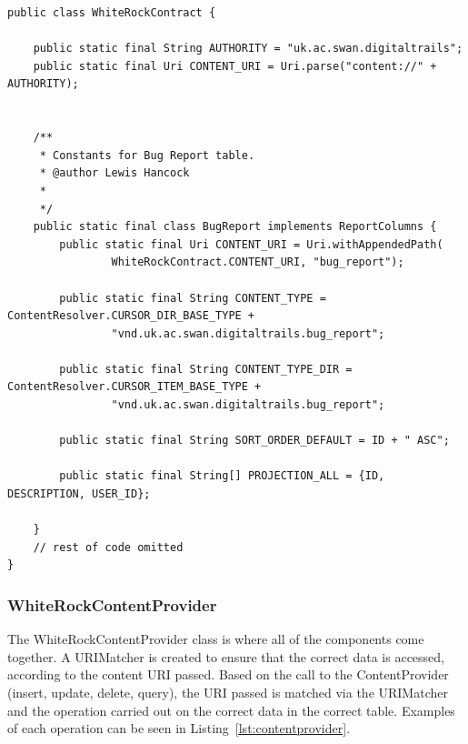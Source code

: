 \documentclass[11pt,a4paper]{article}
\begin{document}
\begin{lstlisting}[captionpos=b, caption=WhiteRockContract Snippet, label=lst:contract, frame=single]
public class WhiteRockContract {

	public static final String AUTHORITY = "uk.ac.swan.digitaltrails";
	public static final Uri CONTENT_URI = Uri.parse("content://" + AUTHORITY);


	/**
	 * Constants for Bug Report table.
	 * @author Lewis Hancock
	 *
	 */
	public static final class BugReport implements ReportColumns {
		public static final Uri CONTENT_URI = Uri.withAppendedPath(
				WhiteRockContract.CONTENT_URI, "bug_report");

		public static final String CONTENT_TYPE = ContentResolver.CURSOR_DIR_BASE_TYPE +
				"vnd.uk.ac.swan.digitaltrails.bug_report";

		public static final String CONTENT_TYPE_DIR = ContentResolver.CURSOR_ITEM_BASE_TYPE +
				"vnd.uk.ac.swan.digitaltrails.bug_report";

		public static final String SORT_ORDER_DEFAULT = ID + " ASC";

		public static final String[] PROJECTION_ALL = {ID, DESCRIPTION, USER_ID};

	}
	// rest of code omitted
}
\end{lstlisting}

\subsubsection{WhiteRockContentProvider}
The WhiteRockContentProvider class is where all of the components come together. A URIMatcher is created to ensure that the correct data is accessed, according to the content URI passed. Based on the call to the ContentProvider (insert, update, delete, query), the URI passed is matched via the URIMatcher and the operation carried out on the correct data in the correct table. Examples of each operation can be seen in Listing~\ref{lst:contentprovider}.
\end{document}
